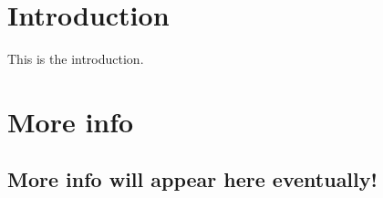 \hypertarget{index_intro}{}\section{Introduction}\label{index_intro}
This is the introduction.\hypertarget{index_install}{}\section{More info}\label{index_install}
\hypertarget{index_step1}{}\subsection{More info will appear here eventually!}\label{index_step1}

